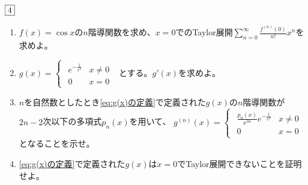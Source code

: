 \documentclass[dvipdfmx]{jsreport}
\newcounter{num}[section]
\begin{document}
\begin{tcolorbox} %
	$\fbox{4}$
\begin{enumerate}
	\item $f(x)= \cos{x}$の$n$階導関数を求め、$x= 0$でのTaylor展開$\sum_{n= 0}^\infty \frac{f^{(n)}(0)}{n!}x^n$を求めよ。
	\item\label{eq:g(x)の定義} $
	g(x)= 
\begin{cases}
\begin{matrix}
	e^{-\frac{1}{x^2}}& x\ne 0\\
	0& x= 0
\end{matrix}
\end{cases}
$
	とする。$g'(x)$を求めよ。
	\item $n$を自然数としたとき\eqref{eq:g(x)の定義}で定義された$g(x)$の$n$階導関数が$2n- 2$次以下の多項式$p_n(x)$を用いて、
$
	g^{(n)}(x)=
\begin{cases}
\begin{matrix}
	\frac{p_n(x)}{x^{3n}}e^{-\frac{1}{x^2}}& x\ne 0\\
	0& x= 0
\end{matrix}
\end{cases}
$
	となることを示せ。
	\item \eqref{eq:g(x)の定義}で定義された$g(x)$は$x= 0$でTaylor展開できないことを証明せよ。
\end{enumerate}
\end{tcolorbox}
\end{document}
